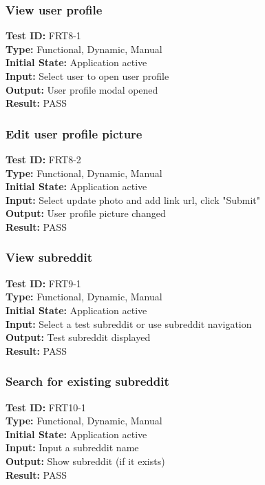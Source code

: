 \documentclass[12pt,fleqn]{article}
\begin{document}
\subsubsection{View user profile}
\textbf{Test ID:} FRT8-1\\
\textbf{Type:} Functional, Dynamic, Manual\\
\textbf{Initial State:} Application active \\
\textbf{Input:} Select user to open user profile  \\
\textbf{Output:} User profile modal opened\\
\textbf{Result:} PASS
\newpage
\subsubsection{Edit user profile picture}
\textbf{Test ID:} FRT8-2\\
\textbf{Type:} Functional, Dynamic, Manual\\
\textbf{Initial State:} Application active \\
\textbf{Input:} Select update photo and add link url, click "Submit"  \\
\textbf{Output:} User profile picture changed\\
\textbf{Result:} PASS

\subsubsection{View subreddit}
\textbf{Test ID:} FRT9-1\\ %
\textbf{Type:} Functional, Dynamic, Manual\\
\textbf{Initial State:} Application active \\
\textbf{Input:} Select a test subreddit or use subreddit navigation \\
\textbf{Output:} Test subreddit displayed\\
\textbf{Result:} PASS

\subsubsection{Search for existing subreddit}
\textbf{Test ID:} FRT10-1\\ %
\textbf{Type:} Functional, Dynamic, Manual\\
\textbf{Initial State:} Application active \\
\textbf{Input:} Input a subreddit name \\
\textbf{Output:} Show subreddit (if it exists)\\
\textbf{Result:} PASS
\end{document}
